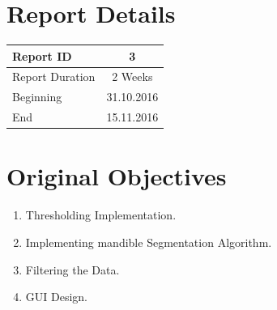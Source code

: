 \documentclass[10pt, b5paper]{article}
\begin{document}
\title{\rmfamily\normalfont{}}

\author{{\small Automatic Mandible Segmentation Using VTK}}

\date{\footnotesize{\today}}

\maketitle

% 
 


\section{Report Details}
\begin{center}
\begin{tabular}{ l | c }
\hline 
Report ID & 3  \\ %
\hline 
Report Duration & 2 Weeks \\ %
\hline 
Beginning & 31.10.2016 \\ %
\hline 
End & 15.11.2016 \\ %
\hline 
\end{tabular}
\end{center}

\section{Original Objectives}
\begin{enumerate}
\item Thresholding Implementation.
\item Implementing mandible Segmentation Algorithm.
\item Filtering the Data.
\item GUI Design.
\end{enumerate}
\end{document}
